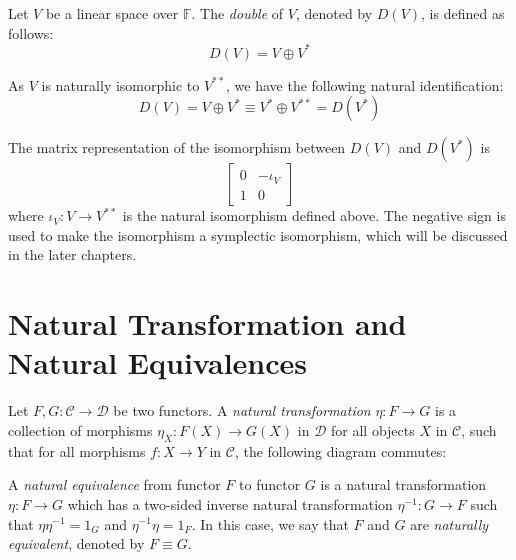 \documentclass[
	11pt, %
	fleqn, %
	a4paper, %
]{LegrandOrangeBook}
\newcommand{\F}{\mathbb{F}} %
\newcommand{\C}{\mathcal{C}} %
\newcommand{\D}{\mathcal{D}} %
\begin{document}
\begin{definition}[Doubles]
    Let $V$ be a linear space over $\F$. The \emph{double} of $V$, denoted by $D(V)$, is defined as follows:
    \[
        D(V) = V \oplus V^*
    \]
\end{definition}

As $V$ is naturally isomorphic to $V^{**}$, we have the following natural identification:
\[
    D(V) = V \oplus V^* \equiv V^* \oplus V^{**} = D(V^*)
\]

The matrix representation of the isomorphism between $D(V)$ and $D(V^*)$ is
\[
    \begin{bmatrix}
        0 & -\iota_V \\
        1 & 0
    \end{bmatrix}
\]
where $\iota_V : V \to V^{**}$ is the natural isomorphism defined above. The negative sign is used to make the isomorphism a symplectic isomorphism, which will be discussed in the later chapters.

\newpage

\section{Natural Transformation and Natural Equivalences}

\begin{definition}
    Let $F, G : \C \to \D$ be two functors. A \emph{natural transformation} $\eta : F \to G$ is a collection of morphisms $\eta_X : F(X) \to G(X)$ in $\D$ for all objects $X$ in $\C$, such that for all morphisms $f : X \to Y$ in $\C$, the following diagram commutes:
    \begin{center}
    \end{center}
\end{definition}

\begin{definition}
    A \emph{natural equivalence} from functor $F$ to functor $G$ is a natural transformation $\eta : F \to G$ which has a two-sided inverse natural transformation $\eta^{-1} : G \to F$ such that $\eta \eta^{-1} = 1_G$ and $\eta^{-1} \eta = 1_F$. In this case, we say that $F$ and $G$ are \emph{naturally equivalent}, denoted by $F \equiv G$.
\end{definition}
\end{document}
